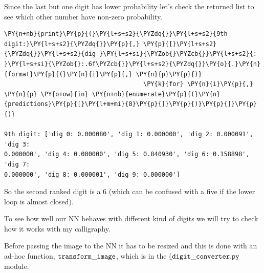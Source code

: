 Since the last but one digit has lower probability let's check the
returned list to see which other number have non-zero probability.

\begin{codebox}[breakable, size=fbox, boxrule=1pt, pad at break*=1mm,colback=cellbackground, colframe=cellborder]
\begin{Verbatim}[commandchars=\\\{\}]
\PY{n+nb}{print}\PY{p}{(}\PY{l+s+s2}{\PYZdq{}}\PY{l+s+s2}{9th digit:}\PY{l+s+s2}{\PYZdq{}}\PY{p}{,} \PY{p}{[}\PY{l+s+s2}{\PYZdq{}}\PY{l+s+s2}{dig }\PY{l+s+si}{\PYZob{}\PYZcb{}}\PY{l+s+s2}{: }\PY{l+s+si}{\PYZob{}:.6f\PYZcb{}}\PY{l+s+s2}{\PYZdq{}}\PY{o}{.}\PY{n}{format}\PY{p}{(}\PY{n}{i}\PY{p}{,} \PY{n}{p}\PY{p}{)} 
                                      \PY{k}{for} \PY{n}{i}\PY{p}{,} \PY{n}{p} \PY{o+ow}{in} \PY{n+nb}{enumerate}\PY{p}{(}\PY{n}{predictions}\PY{p}{[}\PY{l+m+mi}{8}\PY{p}{]}\PY{p}{)}\PY{p}{]}\PY{p}{)}

9th digit: ['dig 0: 0.000080', 'dig 1: 0.000000', 'dig 2: 0.000091', 'dig 3:
0.000000', 'dig 4: 0.000000', 'dig 5: 0.840930', 'dig 6: 0.158898', 'dig 7:
0.000000', 'dig 8: 0.000001', 'dig 9: 0.000000']
\end{Verbatim}
\end{codebox}

So the second ranked digit is a 6 (which can be confused with a five if
the lower loop is almost closed).

To see how well our NN behaves with different kind of digits we will try
to check how it works with my calligraphy.

Before passing the image to the NN it has to be resized and this is done
with an ad-hoc function, \(\tt{transform\_image}\), which is in the
 \href{https://drive.google.com/file/d/1FMYvOJDDOdIv7kDb2VIGhAkNNmReiOb_/view?usp=sharing}{(\(\tt{digit\_converter.py}\)} module.

